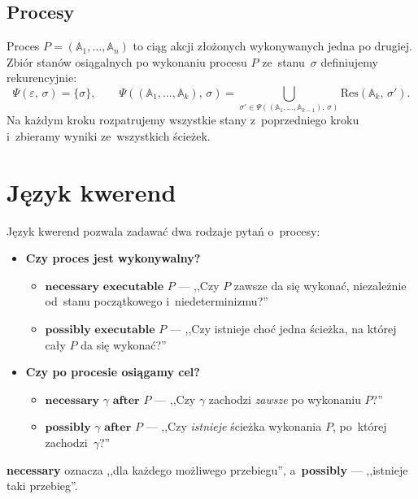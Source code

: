 \documentclass[11pt,a4paper]{article}
\newcommand{\aft}{\textbf{after}}
\newcommand{\necessary}{\textbf{necessary}}
\newcommand{\possibly}{\textbf{possibly}}
\newcommand{\executable}{\textbf{executable}}
\begin{document}
\subsection*{Procesy}

Proces $P = (\mathbb{A}_1, \ldots, \mathbb{A}_n)$ to ciąg akcji złożonych
wykonywanych jedna po drugiej.
Zbiór stanów osiągalnych po wykonaniu procesu $P$ ze~stanu~$\sigma$
definiujemy rekurencyjnie:
\[
  \Psi(\varepsilon,\,\sigma) = \{\sigma\},
  \qquad
  \Psi((\mathbb{A}_1,\ldots,\mathbb{A}_k),\,\sigma)
    = \bigcup_{\sigma' \in \Psi((\mathbb{A}_1,\ldots,\mathbb{A}_{k-1}),\,\sigma)}
      \mathrm{Res}(\mathbb{A}_k,\,\sigma').
\]
Na każdym kroku rozpatrujemy wszystkie stany z~poprzedniego kroku
i~zbieramy wyniki ze~wszystkich ścieżek.

\section{Język kwerend}

Język kwerend pozwala zadawać dwa rodzaje pytań o~procesy:

\begin{itemize}
  \item \textbf{Czy proces jest wykonywalny?}
    \begin{itemize}
      \item $\necessary$ $\executable$ $P$ --- ,,Czy $P$ zawsze da się wykonać,
        niezależnie od~stanu początkowego i~niedeterminizmu?''
      \item $\possibly$ $\executable$ $P$ --- ,,Czy istnieje choć jedna ścieżka,
        na której cały $P$ da się wykonać?''
    \end{itemize}

  \item \textbf{Czy po procesie osiągamy cel?}
    \begin{itemize}
      \item $\necessary$ $\gamma$ $\aft$ $P$ --- ,,Czy $\gamma$ zachodzi \emph{zawsze}
        po wykonaniu $P$?''
      \item $\possibly$ $\gamma$ $\aft$ $P$ --- ,,Czy \emph{istnieje} ścieżka
        wykonania $P$, po~której zachodzi~$\gamma$?''
    \end{itemize}
\end{itemize}

\necessary{} oznacza ,,dla każdego możliwego przebiegu'',
a~\possibly{} --- ,,istnieje taki przebieg''.
\end{document}

